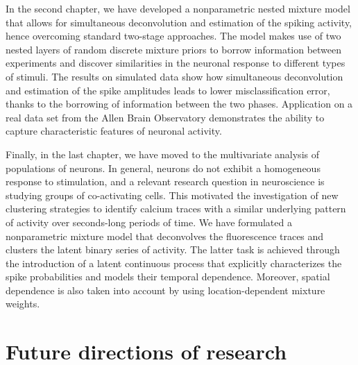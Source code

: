 In the second chapter, we have developed a nonparametric nested mixture model that allows for simultaneous deconvolution and estimation of the spiking activity, hence overcoming standard two-stage approaches.
The model makes use of two nested layers of random discrete mixture priors to borrow information between experiments and discover similarities in the neuronal response to different types of stimuli. 
The results on simulated data show how simultaneous deconvolution and estimation of the spike amplitudes leads to lower misclassification error, thanks to the borrowing of information between the two phases. Application on a real data set from the Allen Brain Observatory demonstrates the ability to capture characteristic features of neuronal activity.

Finally, in the last chapter, we have moved to the multivariate analysis of populations of neurons. In general, neurons do not exhibit a homogeneous response to stimulation, and a relevant research question in neuroscience is studying groups of co-activating cells.
This motivated the investigation of new clustering strategies to identify calcium traces with a similar underlying pattern of activity over seconds-long periods of time.
We have formulated a nonparametric mixture model that deconvolves the fluorescence traces and clusters the latent binary series of activity. The latter task is achieved through the introduction of a latent continuous process that explicitly characterizes the spike probabilities and models their temporal dependence. Moreover, spatial dependence is also taken into account by using location-dependent mixture weights.

\section*{Future directions of research}









